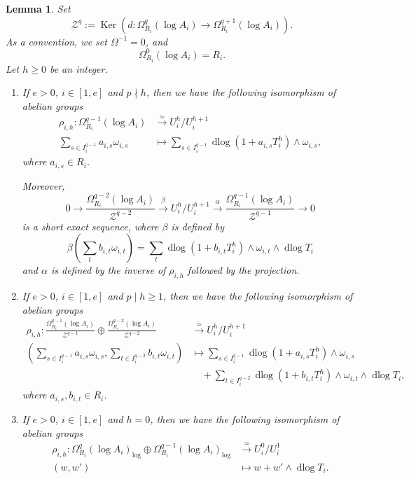 \documentclass[11pt]{amsart}
\newcommand{\eq}[2]{\begin{equation}\label{#1}#2 \end{equation}}
\newcommand{\ra}{\rightarrow}
\newcommand{\cZ}{\mathcal{Z}}
\newcommand{\Ker}{\operatorname{Ker}}
\newcommand{\xra}{\xrightarrow}
\newcommand{\dlog}{\operatorname{dlog}}
\theoremstyle{plain}
\newtheorem{lem}[prop]{Lemma}
\theoremstyle{definition}
\numberwithin{equation}{prop}
\begin{document}
\begin{lem}
\label{lem3}
Set 
$$\cZ^{q}:=
\Ker(d: \Omega^{q}_{R_i}(\log A_i)\ra \Omega^{q+1}_{R_i}(\log A_i)).
$$
As a convention, we set $\Omega^{-1}=0$, and
$$\Omega^0_{R_i}(\log A_i)=R_i.$$
Let $h\ge 0$ be an integer.
\begin{enumerate}
\item\label{lem3(1} 
If $e>0$, $i\in [1,e]$ and $p\nmid h$, then we have the following isomorphism of abelian groups
\begin{align*}
\rho_{i,h}:
\Omega^{q-1}_{R_i}(\log A_i)
&\xra{\simeq}
U_i^{h}/U_i^{h+1}
\\
\sum_{s\in I_i^{q-1}} a_{i,s}\omega_{i,s}
&\mapsto
    \sum_{s\in I_i^{q-1}} \dlog(1+a_{i,s}T_i^{h})\wedge\omega_{i,s},
\end{align*}
where $a_{i,s}\in R_i$.

Moreover, 
$$0\ra \frac{\Omega^{q-2}_{R_i}(\log A_i)}{\cZ^{q-2}}
\xra{\beta} U_i^{h}/U_i^{h+1}
\xra{\alpha} \frac{\Omega^{q-1}_{R_i}(\log A_i)}{\cZ^{q-1}}
\ra 0 $$
is a short exact sequence, where $\beta$ is defined by
\eq{betaeq}{
\beta(\sum_t b_{i,t}\omega_{i,t})=\sum_{t} \dlog(1+b_{i,t}T_i^{h})\wedge\omega_{i,t}\wedge\dlog T_i
}
and $\alpha$ is defined by the inverse of $\rho_{i,h}$ followed by the projection.
\item \label{lem3(2}
If $e>0$, $i\in[1,e]$ and $p\mid h\ge 1$, then we have the following isomorphism of abelian groups
\begin{align*}
\rho_{i,h}:
\frac{\Omega^{q-1}_{R_i}(\log A_i)}
{\cZ^{q-1}}
\oplus
\frac{\Omega^{q-2}_{R_i}(\log A_i)}
{\cZ^{q-2}}
&\xra{\simeq}
U_i^{h}/U_i^{h+1}
\\
\left(
\sum_{s\in I_i^{q-1}} a_{i,s}\omega_{i,s},
\sum_{t\in I_i^{q-2}} b_{i,t}\omega_{i,t}
\right) 
&\mapsto
\sum_{s\in I_i^{q-1}} 
\dlog(1+a_{i,s}T_i^{h})\wedge\omega_{i,s}
\\
&\quad +
\sum_{t\in I_i^{q-2}} 
\dlog(1+b_{i,t}T_i^{h})\wedge\omega_{i,t}
\wedge \dlog T_i,
\end{align*}
where $a_{i,s}, b_{i,t}\in R_i$.


\item \label{lem3(3}
If $e>0$, $i\in [1,e]$ and $h=0$, then we have the following isomorphism of abelian groups
\begin{align*}
\rho_{i,h}:
\Omega^{q}_{R_i}(\log A_i)_{\log}
\oplus
\Omega^{q-1}_{R_i}(\log A_i)_{\log}
&\xra{\simeq}
U_i^{0}/U_i^{1}
\\
(w,w')&\mapsto w+w'\wedge \dlog T_i.
\end{align*}





\end{enumerate}
\end{lem}
\end{document}

